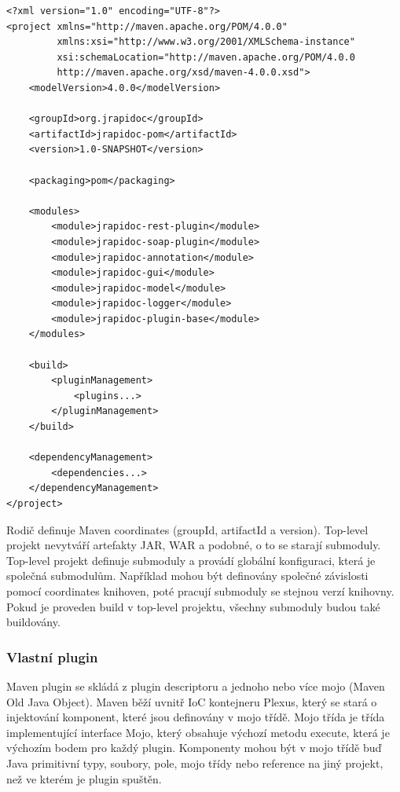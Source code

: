 \documentclass[11pt,twoside,a4paper]{book}
\begin{document}
\begin{lstlisting}[frame=single]
<?xml version="1.0" encoding="UTF-8"?>
<project xmlns="http://maven.apache.org/POM/4.0.0"
         xmlns:xsi="http://www.w3.org/2001/XMLSchema-instance"
         xsi:schemaLocation="http://maven.apache.org/POM/4.0.0
         http://maven.apache.org/xsd/maven-4.0.0.xsd">
    <modelVersion>4.0.0</modelVersion>

    <groupId>org.jrapidoc</groupId>
    <artifactId>jrapidoc-pom</artifactId>
    <version>1.0-SNAPSHOT</version>

    <packaging>pom</packaging>

    <modules>
        <module>jrapidoc-rest-plugin</module>
        <module>jrapidoc-soap-plugin</module>
        <module>jrapidoc-annotation</module>
        <module>jrapidoc-gui</module>
        <module>jrapidoc-model</module>
        <module>jrapidoc-logger</module>
        <module>jrapidoc-plugin-base</module>
    </modules>

    <build>
        <pluginManagement>
            <plugins...>
        </pluginManagement>
    </build>

    <dependencyManagement>
        <dependencies...>
    </dependencyManagement>
</project>
\end{lstlisting}

Rodič definuje Maven coordinates (groupId, artifactId a version). Top-level projekt nevytváří
artefakty JAR, WAR a podobné, o to se starají submoduly. Top-level projekt definuje
submoduly a provádí globální konfiguraci, která je společná submodulům. Například mohou
být definovány společné závislosti pomocí coordinates knihoven, poté pracují submoduly se
stejnou verzí knihovny. Pokud je proveden build v top-level projektu, všechny submoduly
budou také buildovány.

\subsubsection{Vlastní plugin}

Maven plugin se skládá z plugin descriptoru a jednoho nebo více mojo (Maven Old Java
Object). Maven běží uvnitř IoC kontejneru Plexus, který se stará o injektování komponent,
které jsou definovány v mojo třídě. Mojo třída je třída implementující interface Mojo, který
obsahuje výchozí metodu execute, která je výchozím bodem pro každý plugin. Komponenty
mohou být v mojo třídě buď Java primitivní typy, soubory, pole, mojo třídy nebo reference na
jiný projekt, než ve kterém je plugin spuštěn.
\end{document}
